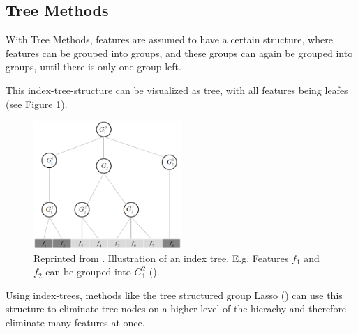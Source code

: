 \subsection{Tree Methods}
\label{sec:methods.structured.tree}


With Tree Methods, features are assumed to have a certain structure, where
features can be grouped into groups, and these groups can again be grouped into
groups, until there is only one group left.

This index-tree-structure can be visualized as tree, with all features being
leafes (see Figure \ref{fig:methods.structured.tree.lasso}).

\begin{figure}[!ht]
  \centering 
  \includegraphics[width=0.5\textwidth]{chapters/methods/structured/tree_lasso}
  \caption{Reprinted from \cite{Tang:04}. Illustration of an index tree.
  E.g. Features $f_1$ and $f_2$ can be grouped into $G_1^2$ (\cite{Tang:04}).}
  \label{fig:methods.structured.tree.lasso}
\end{figure}

Using index-trees, methods like the tree structured group Lasso (\cite{Kim:10})
can use this structure to eliminate tree-nodes on a higher level of the hierachy and
therefore eliminate many features at once.